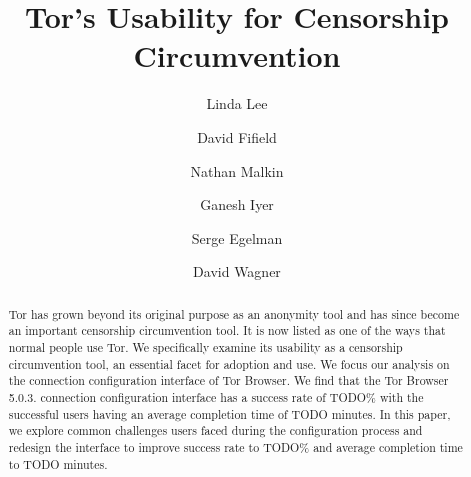 \documentclass[USenglish,oneside,twocolumn]{article}
\begin{document}
 
  \author*[1]{Linda Lee}

  \author[2]{David Fifield}

  \author[3]{Nathan Malkin}

  \author[4]{Ganesh Iyer}

  \author[5]{Serge Egelman}
  
  \author[6]{David Wagner}




  
   

  \title{\huge Tor's Usability for Censorship Circumvention}



  \begin{abstract}
{Tor has grown beyond its original purpose as an anonymity tool and has 
since become an important censorship circumvention tool. It is now listed
as one of the ways that normal people use Tor.
We specifically examine its usability as a censorship circumvention tool,
an essential facet for adoption and use. We focus our analysis on the connection 
configuration interface of Tor Browser. We find that the Tor Browser 5.0.3. connection
configuration interface has a success rate of {\color {red} TODO}\% with the 
successful users having an average completion time of {\color {red} TODO} minutes. 
In this paper, we explore common challenges users faced during the configuration
process and redesign the interface to improve success rate to {\color {red} TODO}\% 
and average completion time to {\color {red} TODO} minutes.}
\end{abstract}
\end{document}
